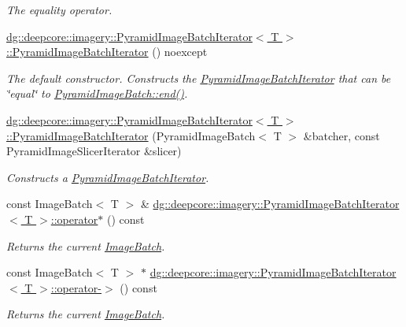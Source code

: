 \begin{DoxyCompactItemize}
\begin{DoxyCompactList}\small\item\em The equality operator. \end{DoxyCompactList}\item 
\hyperlink{group___imagery_module_ga9859e48a78c1a93cbc5d6ec39bfa33c4}{dg\+::deepcore\+::imagery\+::\+Pyramid\+Image\+Batch\+Iterator$<$ T $>$\+::\+Pyramid\+Image\+Batch\+Iterator} () noexcept
\begin{DoxyCompactList}\small\item\em The default constructor. Constructs the \hyperlink{classdg_1_1deepcore_1_1imagery_1_1_pyramid_image_batch_iterator}{Pyramid\+Image\+Batch\+Iterator} that can be \char`\"{}equal\char`\"{} to \hyperlink{group___imagery_module_ga7e2fa7f2608bc1784f52c8f165fcc2f7}{Pyramid\+Image\+Batch\+::end()}. \end{DoxyCompactList}\item 
\hyperlink{group___imagery_module_gafaa065adfee60c6db16f2c398c438400}{dg\+::deepcore\+::imagery\+::\+Pyramid\+Image\+Batch\+Iterator$<$ T $>$\+::\+Pyramid\+Image\+Batch\+Iterator} (Pyramid\+Image\+Batch$<$ T $>$ \&batcher, const Pyramid\+Image\+Slicer\+Iterator \&slicer)
\begin{DoxyCompactList}\small\item\em Constructs a \hyperlink{classdg_1_1deepcore_1_1imagery_1_1_pyramid_image_batch_iterator}{Pyramid\+Image\+Batch\+Iterator}. \end{DoxyCompactList}\item 
const Image\+Batch$<$ T $>$ \& \hyperlink{group___imagery_module_gac21ea85be8311510322c9fdd5c9ebe50}{dg\+::deepcore\+::imagery\+::\+Pyramid\+Image\+Batch\+Iterator$<$ T $>$\+::operator$\ast$} () const 
\begin{DoxyCompactList}\small\item\em Returns the current \hyperlink{structdg_1_1deepcore_1_1imagery_1_1_image_batch}{Image\+Batch}. \end{DoxyCompactList}\item 
const Image\+Batch$<$ T $>$ $\ast$ \hyperlink{group___imagery_module_gaccd917f1703532af22119b69f9f87acc}{dg\+::deepcore\+::imagery\+::\+Pyramid\+Image\+Batch\+Iterator$<$ T $>$\+::operator-\/$>$} () const 
\begin{DoxyCompactList}\small\item\em Returns the current \hyperlink{structdg_1_1deepcore_1_1imagery_1_1_image_batch}{Image\+Batch}. \end{DoxyCompactList}\item 

\end{DoxyCompactItemize}
